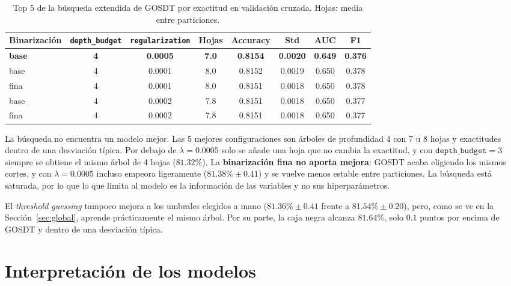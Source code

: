 \documentclass[a4paper,11pt]{article}
\begin{document}
\begin{table}[H]
\centering
\small
\begin{tabular}{@{}lccccccc@{}}
\toprule
Binarización & \texttt{depth\_budget} & \texttt{regularization} & Hojas & Accuracy & Std & AUC & F1 \\
\midrule
\textbf{base} & \textbf{4} & \textbf{0.0005} & \textbf{7.0} & \textbf{0.8154} & \textbf{0.0020} & \textbf{0.649} & \textbf{0.376} \\
base & 4 & 0.0001 & 8.0 & 0.8152 & 0.0019 & 0.650 & 0.378 \\
fina & 4 & 0.0001 & 8.0 & 0.8151 & 0.0018 & 0.650 & 0.378 \\
base & 4 & 0.0002 & 7.8 & 0.8151 & 0.0018 & 0.650 & 0.377 \\
fina & 4 & 0.0002 & 7.8 & 0.8151 & 0.0018 & 0.650 & 0.377 \\
\bottomrule
\end{tabular}
\caption{Top 5 de la búsqueda extendida de GOSDT por exactitud en validación cruzada. Hojas: media entre particiones.}
\label{tab:gosdt_top5}
\end{table}

La búsqueda no encuentra un modelo mejor. Las 5 mejores configuraciones son árboles de profundidad 4 con 7 u 8 hojas y exactitudes dentro de una desviación típica. Por debajo de $\lambda = 0.0005$ solo se añade una hoja que no cambia la exactitud, y con $\texttt{depth\_budget}=3$ siempre se obtiene el mismo árbol de 4 hojas ($81.32\%$). La \textbf{binarización fina no aporta mejora}: GOSDT acaba eligiendo los mismos cortes, y con $\lambda = 0.0005$ incluso empeora ligeramente ($81.38\% \pm 0.41$) y se vuelve menos estable entre particiones. La búsqueda está saturada, por lo que lo que limita al modelo es la información de las variables y no sus hiperparámetros.

El \textit{threshold guessing} tampoco mejora a los umbrales elegidos a mano ($81.36\% \pm 0.41$ frente a $81.54\% \pm 0.20$), pero, como se ve en la Sección~\ref{sec:global}, aprende prácticamente el mismo árbol. Por su parte, la caja negra alcanza $81.64\%$, solo $0.1$ puntos por encima de GOSDT y dentro de una desviación típica.

\section{Interpretación de los modelos}
\end{document}
